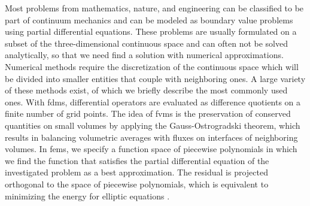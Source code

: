 Most problems from mathematics, nature, and engineering can be classified to be part of continuum mechanics and can be modeled as boundary value problems using partial differential equations. These problems are usually formulated on a subset of the three-dimensional continuous space and can often not be solved analytically, so that we need find a solution with numerical approximations. Numerical methods require the discretization of the continuous space which will be divided into smaller entities that couple with neighboring ones. A large variety of these methods exist, of which we briefly describe the most commonly used ones.
With \glspl{fdm}, differential operators are evaluated as difference quotients on a finite number of grid points. %
The idea of \glspl{fvm} is the preservation of conserved quantities on small volumes by applying the Gauss-Ostrogradski theorem, which results in balancing volumetric averages with fluxes on interfaces of neighboring volumes.
In \glspl{fem}, we specify a function space of piecewise polynomials in which we find the function that satisfies the partial differential equation of the investigated problem as a best approximation.
The residual is projected orthogonal to the space of piecewise polynomials, which is equivalent to minimizing the energy for elliptic equations \parencite{brenner2008}.


